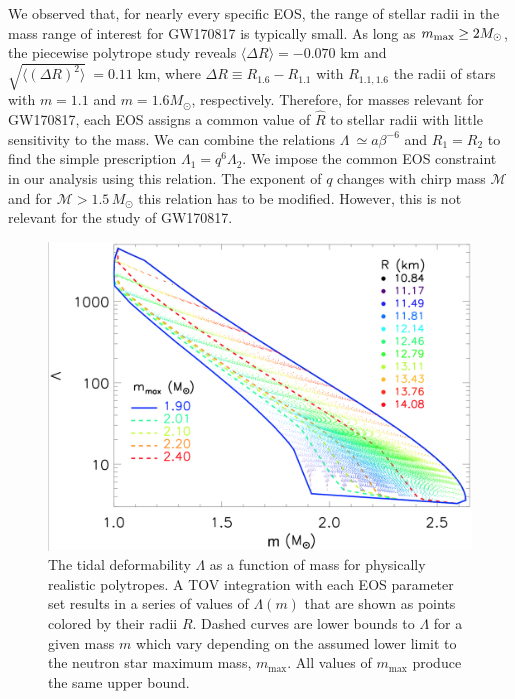 We observed that, for nearly every specific EOS, the range of stellar radii in the mass range of interest for GW170817 is typically small. As long as $m_{\rm max}\ge 2M_\odot$, the piecewise polytrope study reveals $\langle \Delta R \rangle =-0.070$ km and $\sqrt{\langle(\Delta R)^2\rangle}~=0.11$ km, where $\Delta R \equiv R_{1.6}-R_{1.1}$ with $R_{1.1,1.6}$ the radii of stars with $m=1.1$ and $m=1.6M_\odot$, respectively. Therefore, for masses relevant for GW170817, each EOS assigns a common value of $\hat R$ to stellar radii with little sensitivity to the mass. We can combine the relations $\Lambda~\simeq a\beta^{-6}$ and $R_1=R_2$ to find the simple prescription $\Lambda_1=q^6\Lambda_2$. We impose the common EOS constraint in our analysis using this relation. The exponent of $q$ changes with chirp mass $\mathcal{M}$ and for $\mathcal{M} > 1.5\,M_\odot$ this relation has to be modified. However, this is not relevant for the study of GW170817.

\begin{figure}[t]
  \includegraphics[width=\columnwidth]{figures/common_eos/lam-mass.png}
  \caption{The tidal deformability $\Lambda$ as a function of mass for physically realistic polytropes. A TOV integration with each EOS parameter set results in a series of values of $\Lambda(m)$ that are shown as points colored by their radii $R$. Dashed curves are lower bounds to $\Lambda$ for a given mass $m$ which vary depending on the assumed lower limit to the neutron star maximum mass, $m_\mathrm{max}$.  All values of $m_\mathrm{max}$ produce the same upper bound. \label{fig:lam-mass}}
\end{figure}



